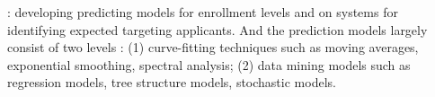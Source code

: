 \documentclass[12pt,english]{report}
\begin{document}

\citet{Maltz2007}: developing predicting models for enrollment levels and
on systems for identifying expected targeting applicants. And the prediction
models largely consist of two levels \citet{Aksenova2006}: (1)
curve-fitting techniques such as moving averages, exponential smoothing,
spectral analysis; (2) data mining models such as regression models, tree
structure models, stochastic models.
\end{document}
